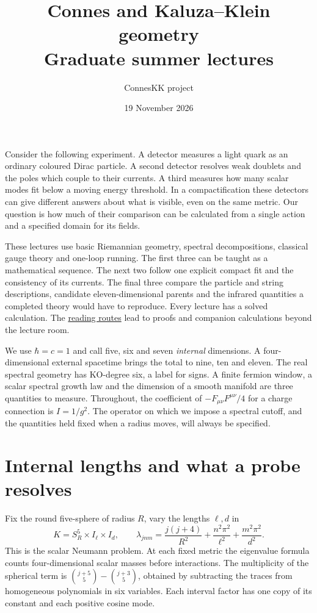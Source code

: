 \documentclass[10pt]{article}
\theoremstyle{definition}
\begin{document}
\title{Connes and Kaluza--Klein geometry\\[2pt]\large Graduate summer lectures}
\author{ConnesKK project}
\date{19 November 2026}
\maketitle

Consider the following experiment. A detector measures a light quark as an ordinary coloured Dirac particle. A second detector resolves weak doublets and the poles which couple to their currents. A third measures how many scalar modes fit below a moving energy threshold. In a compactification these detectors can give different answers about what is visible, even on the same metric. Our question is how much of their comparison can be calculated from a single action and a specified domain for its fields.

These lectures use basic Riemannian geometry, spectral decompositions, classical gauge theory and one-loop running. The first three can be taught as a mathematical sequence. The next two follow one explicit compact fit and the consistency of its currents. The final three compare the particle and string descriptions, candidate eleven-dimensional parents and the infrared quantities a completed theory would have to reproduce. Every lecture has a solved calculation. The \href{https://github.com/arivero/conneskk/blob/master/results/README.md}{reading routes} lead to proofs and companion calculations beyond the lecture room.

We use \(\hbar=c=1\) and call five, six and seven \emph{internal} dimensions. A four-dimensional external spacetime brings the total to nine, ten and eleven. The real spectral geometry has KO-degree six, a label for signs. A finite fermion window, a scalar spectral growth law and the dimension of a smooth manifold are three quantities to measure. Throughout, the coefficient of \(-F_{\mu\nu}F^{\mu\nu}/4\) for a charge connection is \(I=1/g^2\). The operator on which we impose a spectral cutoff, and the quantities held fixed when a radius moves, will always be specified.

\tableofcontents

\section{Internal lengths and what a probe resolves}

Fix the round five-sphere of radius \(R\), vary the lengths \(\ell,d\) in
\begin{equation}
 K=S^5_R\times I_\ell\times I_d ,
 \qquad
 \lambda_{jnm}=\frac{j(j+4)}{R^2}
              +\frac{n^2\pi^2}{\ell^2}+\frac{m^2\pi^2}{d^2}.
 \label{eq:summer-interval}
\end{equation}
This is the scalar Neumann problem. At each fixed metric the eigenvalue formula counts four-dimensional scalar masses before interactions. The multiplicity of the spherical term is \(\binom{j+5}{5}-\binom{j+3}{5}\), obtained by subtracting the traces from homogeneous polynomials in six variables. Each interval factor has one copy of its constant and each positive cosine mode.
\end{document}
